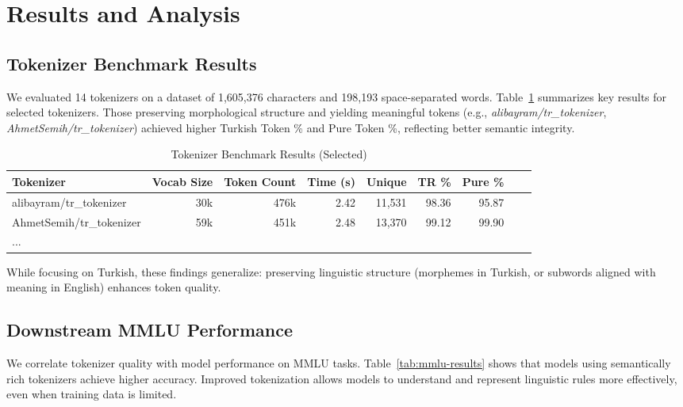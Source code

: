   \section{Results and Analysis}
  
  \subsection{Tokenizer Benchmark Results}
  
  We evaluated 14 tokenizers on a dataset of 1,605,376 characters and 198,193 space-separated words. Table~\ref{tab:tokenizer-benchmark} summarizes key results for selected tokenizers. Those preserving morphological structure and yielding meaningful tokens (e.g., \textit{alibayram/tr\_tokenizer}, \textit{AhmetSemih/tr\_tokenizer}) achieved higher Turkish Token \% and Pure Token \%, reflecting better semantic integrity.
  
  \begin{table}[h]
  \centering
  \caption{Tokenizer Benchmark Results (Selected)}
  \label{tab:tokenizer-benchmark}
  \begin{tabular}{|l|r|r|r|r|r|r|r|r|}
  \hline
  \textbf{Tokenizer} & \textbf{Vocab Size} & \textbf{Token Count} & \textbf{Time (s)} & \textbf{Unique} & \textbf{TR \%} & \textbf{Pure \%} \\ \hline
  alibayram/tr\_tokenizer & 30k & 476k & 2.42 & 11,531 & 98.36 & 95.87 \\ \hline
  AhmetSemih/tr\_tokenizer & 59k & 451k & 2.48 & 13,370 & 99.12 & 99.90 \\ \hline
  ... & & & & & & \\ \hline
  \end{tabular}
  \end{table}
  
  While focusing on Turkish, these findings generalize: preserving linguistic structure (morphemes in Turkish, or subwords aligned with meaning in English) enhances token quality.
  
  \subsection{Downstream MMLU Performance}
  
  We correlate tokenizer quality with model performance on MMLU tasks. Table~\ref{tab:mmlu-results} shows that models using semantically rich tokenizers achieve higher accuracy. Improved tokenization allows models to understand and represent linguistic rules more effectively, even when training data is limited.
  
